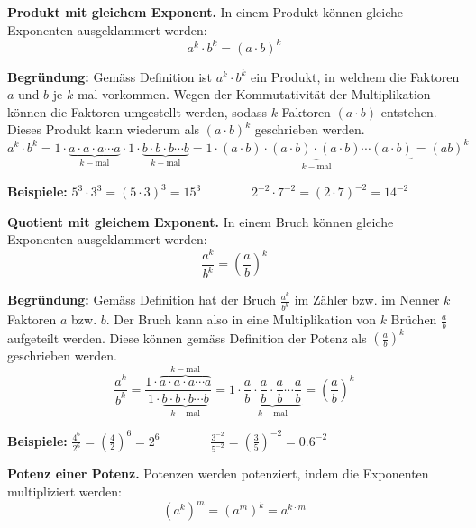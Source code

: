 \begin{theorem}
  \textbf{Produkt mit gleichem Exponent.} In einem Produkt können gleiche Exponenten ausgeklammert werden:
  \[
    a^{k}\cdot b^{k} = (a\cdot b)^{k}
  \]
\end{theorem}

\textbf{Begründung:} Gemäss Definition ist $a^{k}\cdot b^{k}$ ein Produkt, in welchem die Faktoren $a$ und $b$ je $k$-mal vorkommen. Wegen der Kommutativität der Multiplikation können die Faktoren umgestellt werden, sodass $k$ Faktoren $(a\cdot b)$ entstehen. Dieses Produkt kann wiederum als $(a\cdot b)^{k}$ geschrieben werden.
\[
  a^{k}\cdot b^{k} = 1\cdot\underbrace{a\cdot a\cdot a\cdots a}_{k-\text{mal}}\cdot 1\cdot\underbrace{b\cdot b\cdot b\cdots b}_{k-\text{mal}} = 1\cdot\underbrace{(a\cdot b)\cdot (a\cdot b)\cdot (a\cdot b)\cdots (a\cdot b)}_{k-\text{mal}} = (ab)^{k}
\]

\begin{example}
  \textbf{Beispiele:} $\displaystyle 5^{3} \cdot 3^{3} = (5\cdot 3)^{3} = 15^{3} \qquad\qquad 2^{-2}\cdot 7^{-2} = (2\cdot 7)^{-2} = 14^{-2}$
\end{example}

\begin{theorem}
  \textbf{Quotient mit gleichem Exponent.} In einem Bruch können gleiche Exponenten ausgeklammert werden:
  \[
    \frac{a^{k}}{b^{k}} = \left(\frac{a}{b}\right)^{k}
  \]
\end{theorem}

\textbf{Begründung:} Gemäss Definition hat der Bruch $\frac{a^{k}}{b^{k}}$ im Zähler bzw. im Nenner $k$ Faktoren $a$ bzw. $b$. Der Bruch kann also in eine Multiplikation von $k$ Brüchen $\frac{a}{b}$ aufgeteilt werden. Diese können gemäss Definition der Potenz als $\left(\frac{a}{b}\right)^{k}$ geschrieben werden.
\[
  \frac{a^{k}}{b^{k}} = \frac{1\cdot\overbrace{a\cdot a\cdot a\cdots a}^{k-\text{mal}}}{1\cdot\underbrace{b\cdot b\cdot b\cdots b}_{k-\text{mal}}} = 1\cdot\underbrace{\frac{a}{b}\cdot \frac{a}{b}\cdot \frac{a}{b}\cdots \frac{a}{b}}_{k-\text{mal}} = \left(\frac{a}{b}\right)^{k}
\]

\begin{example}
  \textbf{Beispiele:} $\displaystyle \frac{4^{6}}{2^{6}} = \left(\frac{4}{2}\right)^{6} = 2^{6} \qquad\qquad \frac{3^{-2}}{5^{-2}} = \left(\frac{3}{5}\right)^{-2} = 0.6^{-2}$
\end{example}

\begin{theorem}
  \textbf{Potenz einer Potenz.} Potenzen werden potenziert, indem die Exponenten multipliziert werden:
  \[
    \left(a^{k}\right)^{m} = \left(a^{m}\right)^{k}= a^{k\cdot m}
  \]
\end{theorem}

